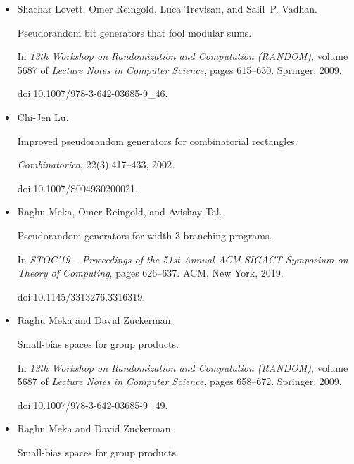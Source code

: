 \documentclass[10pt,a4paper]{article}
\begin{document}
\begin{itemize}
\item[] 
[35]

Shachar Lovett, Omer Reingold, Luca Trevisan, and Salil P. Vadhan.


Pseudorandom bit generators that fool modular sums.


In \emph{13th Workshop on Randomization and Computation (RANDOM)},
volume 5687 of \emph{Lecture Notes in Computer Science}, pages 615–630.
Springer, 2009.


doi:10.1007/978-3-642-03685-9\_46.





\item[] 
[36]

Chi-Jen Lu.


Improved pseudorandom generators for combinatorial rectangles.


\emph{Combinatorica}, 22(3):417–433, 2002.


doi:10.1007/S004930200021.





\item[] 
[37]

Raghu Meka, Omer Reingold, and Avishay Tal.


Pseudorandom generators for width-3 branching programs.


In \emph{STOC’19 – Proceedings of the 51st Annual ACM
SIGACT Symposium on Theory of Computing}, pages 626–637. ACM, New
York, 2019.


doi:10.1145/3313276.3316319.





\item[] 
[38]

Raghu Meka and David Zuckerman.


Small-bias spaces for group products.


In \emph{13th Workshop on Randomization and Computation (RANDOM)},
volume 5687 of \emph{Lecture Notes in Computer Science}, pages 658–672.
Springer, 2009.


doi:10.1007/978-3-642-03685-9\_49.





\item[] 
[39]

Raghu Meka and David Zuckerman.


Small-bias spaces for group products.



\end{itemize}
\end{document}
